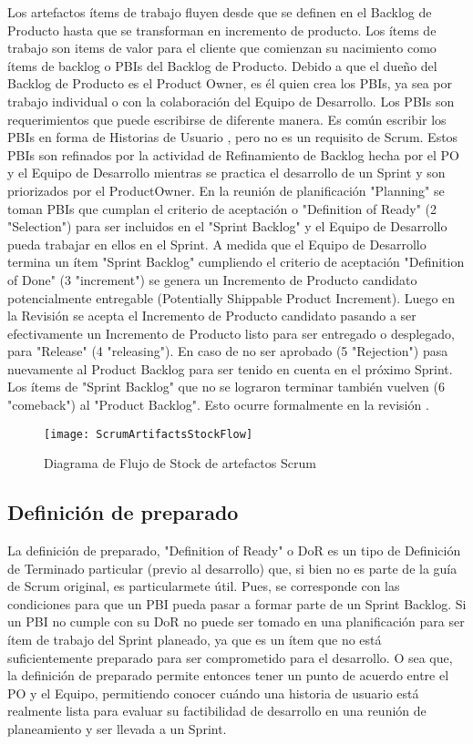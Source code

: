 Los artefactos ítems de trabajo fluyen desde que se definen en el Backlog de Producto hasta que se transforman en incremento de producto. Los ítems de trabajo son items de valor para el cliente que comienzan su nacimiento como ítems de backlog o PBIs del Backlog de Producto. Debido a que el dueño del Backlog de Producto es el Product Owner, es él quien crea los PBIs, ya sea por trabajo individual o con la colaboración del Equipo de Desarrollo. Los PBIs son requerimientos que puede escribirse de diferente manera. Es común escribir los PBIs en forma de Historias de Usuario \cite{Cohn-2004}, pero no es un requisito de Scrum. Estos PBIs son refinados por la actividad de Refinamiento de Backlog hecha por el PO y el Equipo de Desarrollo mientras se practica el desarrollo de un Sprint y son priorizados por el ProductOwner. En la reunión de planificación "Planning" se toman PBIs que cumplan el criterio de aceptación o "Definition of Ready" (2 "Selection") para ser incluidos en el "Sprint Backlog" y el Equipo de Desarrollo pueda trabajar en ellos en el Sprint. A medida que el Equipo de Desarrollo termina un ítem "Sprint Backlog" cumpliendo el criterio de aceptación "Definition of Done" (3 "increment") se genera un Incremento de Producto candidato potencialmente entregable (Potentially Shippable Product Increment). Luego en la Revisión se acepta el Incremento de Producto candidato pasando a ser efectivamente un Incremento de Producto listo para ser entregado o desplegado, para "Release" (4 "releasing"). En caso de no ser aprobado (5 "Rejection") pasa nuevamente al Product Backlog para ser tenido en cuenta en el próximo Sprint. Los ítems de "Sprint Backlog" que no se lograron terminar también vuelven (6 "comeback") al "Product Backlog". Esto ocurre formalmente en la revisión \cite{Martin-Alaimo-2014}.

\begin{figure}[h]
  \centering
  \texttt{[image: ScrumArtifactsStockFlow]}
  \caption{Diagrama de Flujo de Stock de artefactos Scrum}
  \centering
  \label{fig:ScrumArtifactsStockFlow} 
\end{figure}
\FloatBarrier

\subsection{Definición de preparado}

La definición de preparado, "Definition of Ready" o DoR es un tipo de Definición de Terminado particular (previo al desarrollo) que, si bien no es parte de la guía de Scrum original, es particularmete útil. Pues, se corresponde con las condiciones para que un PBI pueda pasar a formar parte de un Sprint Backlog. Si un PBI no cumple con su DoR no puede ser tomado en una planificación para ser ítem de trabajo del Sprint planeado, ya que es un ítem que no está suficientemente preparado para ser comprometido para el desarrollo. O sea que, la definición de preparado permite entonces tener un punto de acuerdo entre el PO y el Equipo, permitiendo conocer cuándo una historia de usuario está realmente lista para evaluar su factibilidad de desarrollo en una reunión de planeamiento y ser llevada a un Sprint.

